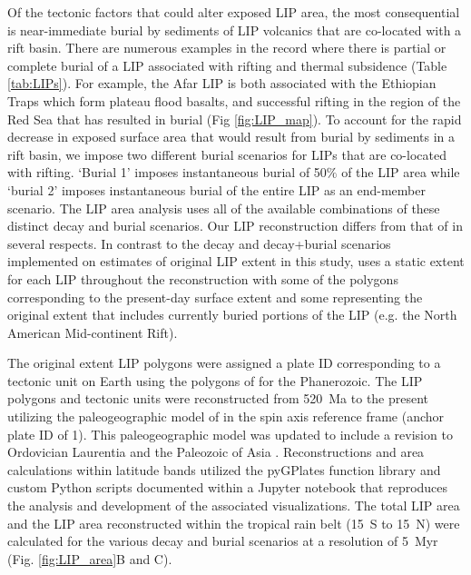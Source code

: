\documentclass[11pt,letterpaper]{article}
\begin{document}
Of the tectonic factors that could alter exposed LIP area, the most consequential is near-immediate burial by sediments of LIP volcanics that are co-located with a rift basin. There are numerous examples in the record where there is partial or complete burial of a LIP associated with rifting and thermal subsidence (Table \ref{tab:LIPs}). For example, the Afar LIP is both associated with the Ethiopian Traps which form plateau flood basalts, and successful rifting in the region of the Red Sea that has resulted in burial (Fig \ref{fig:LIP_map}). To account for the rapid decrease in exposed surface area that would result from burial by sediments in a rift basin, we impose two different burial scenarios for LIPs that are co-located with rifting. `Burial 1' imposes instantaneous burial of 50$\%$ of the LIP area while `burial 2' imposes instantaneous burial of the entire LIP as an end-member scenario. The LIP area analysis uses all of the available combinations of these distinct decay and burial scenarios. Our LIP reconstruction differs from that of \citet{Johansson2018a} in several respects. In contrast to the decay and decay+burial scenarios implemented on estimates of original LIP extent in this study, \citet{Johansson2018a} uses a static extent for each LIP throughout the reconstruction with some of the polygons corresponding to the present-day surface extent and some representing the original extent that includes currently buried portions of the LIP (e.g. the North American Mid-continent Rift).

The original extent LIP polygons were assigned a plate ID corresponding to a tectonic unit on Earth using the polygons of \citet{Torsvik2016a} for the Phanerozoic. The LIP polygons and tectonic units were reconstructed from 520~Ma to the present utilizing the paleogeographic model of \citet{Torsvik2016a} in the spin axis reference frame (anchor plate ID of 1). This paleogeographic model was updated to include a revision to Ordovician Laurentia \citep{Swanson-Hysell2017a} and the Paleozoic of Asia \citep{Domeier2018a}. Reconstructions and area calculations within latitude bands utilized the pyGPlates function library and custom Python scripts documented within a Jupyter notebook that reproduces the analysis and development of the associated visualizations. The total LIP area and the LIP area reconstructed within the tropical rain belt (15\textdegree~S to 15\textdegree~N) were calculated for the various decay and burial scenarios at a resolution of 5~Myr (Fig. \ref{fig:LIP_area}B and C).
\end{document}
